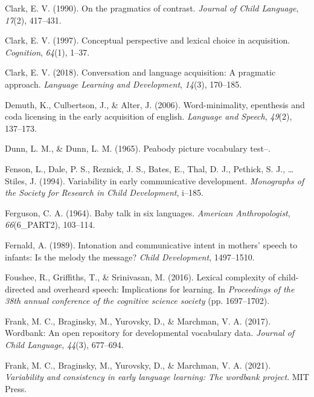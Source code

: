 \documentclass[10pt, letterpaper]{article}
\newenvironment{CSLReferences}%
  {}%
  {\par}
\begin{document}
\begin{CSLReferences}{1}{0}
\leavevmode\hypertarget{ref-clark1990pragmatics}{}%
Clark, E. V. (1990). On the pragmatics of contrast. \emph{Journal of
Child Language}, \emph{17}(2), 417--431.

\leavevmode\hypertarget{ref-clark1997conceptual}{}%
Clark, E. V. (1997). Conceptual perspective and lexical choice in
acquisition. \emph{Cognition}, \emph{64}(1), 1--37.

\leavevmode\hypertarget{ref-clark2018conversation}{}%
Clark, E. V. (2018). Conversation and language acquisition: A pragmatic
approach. \emph{Language Learning and Development}, \emph{14}(3),
170--185.

\leavevmode\hypertarget{ref-demuth2006word}{}%
Demuth, K., Culbertson, J., \& Alter, J. (2006). Word-minimality,
epenthesis and coda licensing in the early acquisition of english.
\emph{Language and Speech}, \emph{49}(2), 137--173.

\leavevmode\hypertarget{ref-dunn1965peabody}{}%
Dunn, L. M., \& Dunn, L. M. (1965). Peabody picture vocabulary test--.

\leavevmode\hypertarget{ref-fenson1994variability}{}%
Fenson, L., Dale, P. S., Reznick, J. S., Bates, E., Thal, D. J.,
Pethick, S. J., \ldots{} Stiles, J. (1994). Variability in early
communicative development. \emph{Monographs of the Society for Research
in Child Development}, i--185.

\leavevmode\hypertarget{ref-ferguson1964baby}{}%
Ferguson, C. A. (1964). Baby talk in six languages. \emph{American
Anthropologist}, \emph{66}(6\_PART2), 103--114.

\leavevmode\hypertarget{ref-fernald1989intonation}{}%
Fernald, A. (1989). Intonation and communicative intent in mothers'
speech to infants: Is the melody the message? \emph{Child Development},
1497--1510.

\leavevmode\hypertarget{ref-foushee2016lexical}{}%
Foushee, R., Griffiths, T., \& Srinivasan, M. (2016). Lexical complexity
of child-directed and overheard speech: Implications for learning. In
\emph{Proceedings of the 38th annual conference of the cognitive science
society} (pp. 1697--1702).

\leavevmode\hypertarget{ref-frank2017wordbank}{}%
Frank, M. C., Braginsky, M., Yurovsky, D., \& Marchman, V. A. (2017).
Wordbank: An open repository for developmental vocabulary data.
\emph{Journal of Child Language}, \emph{44}(3), 677--694.

\leavevmode\hypertarget{ref-frank2021variability}{}%
Frank, M. C., Braginsky, M., Yurovsky, D., \& Marchman, V. A. (2021).
\emph{Variability and consistency in early language learning: The
wordbank project}. MIT Press.


\end{CSLReferences}
\end{document}
